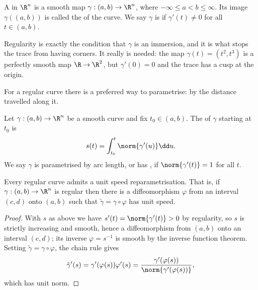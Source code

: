 \begin{definition}
    A  in $\R^n$ is a smooth map $\gamma: (a, b) \rightarrow \R^n$, where $-\infty \leq a < b \leq \infty$. Its image $\gamma((a,b))$ is called the  of the curve. We say $\gamma$ is  if $\gamma'(t) \neq 0$ for all $t \in (a,b)$.
\end{definition}

Regularity is exactly the condition that $\gamma$ is an immersion, and it is what stops the trace from having corners. It really is needed: the map $\gamma(t) = (t^2, t^3)$ is a perfectly smooth map $\R \rightarrow \R^2$, but $\gamma'(0) = 0$ and the trace has a cusp at the origin.

\begin{center}
\end{center}

For a regular curve there is a preferred way to parametrise: by the distance travelled along it.

\begin{definition}
    Let $\gamma: (a,b) \rightarrow \R^n$ be a smooth curve and fix $t_0 \in (a,b)$. The  of $\gamma$ starting at $t_0$ is
    $$
    s(t) = \int_{t_0}^{t} \norm{\gamma'(u)} \dd u.
    $$
    We say $\gamma$ is parametrised by arc length, or has , if $\norm{\gamma'(t)} = 1$ for all $t$.
\end{definition}

\begin{lemma}
    Every regular curve admits a unit speed reparametrisation. That is, if $\gamma: (a,b) \rightarrow \R^n$ is regular then there is a diffeomorphism $\varphi$ from an interval $(c,d)$ onto $(a,b)$ such that $\tilde \gamma = \gamma \circ \varphi$ has unit speed.
\end{lemma}
\begin{proof}
    With $s$ as above we have $s'(t) = \norm{\gamma'(t)} > 0$ by regularity, so $s$ is strictly increasing and smooth, hence a diffeomorphism from $(a,b)$ onto an interval $(c,d)$; its inverse $\varphi = s^{-1}$ is smooth by the inverse function theorem. Setting $\tilde\gamma = \gamma \circ \varphi$, the chain rule gives
    $$
    \tilde\gamma'(s) = \gamma'(\varphi(s)) \varphi'(s) = \frac{\gamma'(\varphi(s))}{\norm{\gamma'(\varphi(s))}},
    $$
    which has unit norm.
\end{proof}


